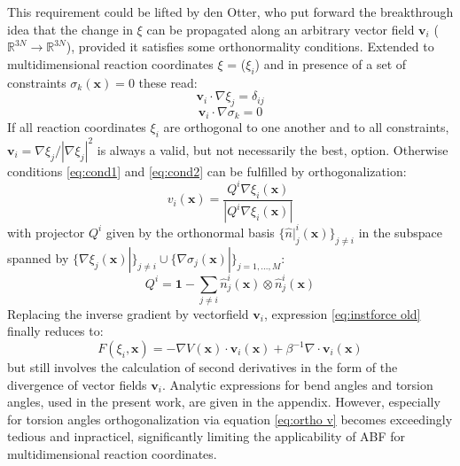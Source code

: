 This requirement could be lifted by den Otter\autocite{den2000thermodynamic}, who put forward the breakthrough idea that the change in $\xi$ can be propagated along an arbitrary vector field $\textbf{v}_i$ ($\mathbb{R}^{3N} \to \mathbb{R}^{3N}$), provided it satisfies some orthonormality conditions.
Extended to multidimensional reaction coordinates \textbf{$\xi$} = ($\xi_i$) and in presence of a set of constraints $\sigma_{k}(\textbf{x})=0$ these read:\autocite{ciccotti2005blue}
\begin{equation}
  \textbf{v}_i \cdot \nabla \xi_j = \delta_{ij} \label{eq:cond1}
\end{equation}
\begin{equation}
  \textbf{v}_i \cdot \nabla \sigma_k = 0 \label{eq:cond2}
\end{equation}
If all reaction coordinates $\xi_i$ are orthogonal to one another and to all constraints, $\textbf{v}_i = \nabla \xi_j/|\nabla \xi_j|^2$ is always a valid, but not necessarily the best, option.
Otherwise conditions \ref{eq:cond1} and \ref{eq:cond2} can be fulfilled by orthogonalization:\autocite{ciccotti2005blue}
\begin{equation}
  v_i (\textbf{x}) = \frac{Q^i \nabla \xi_i (\textbf{x})}{|Q^i \nabla \xi_i (\textbf{x})|} \label{eq:ortho v}
\end{equation}
with projector $Q^i$ given by the orthonormal basis $\{\hat{n}|_{j}^{i}(\textbf{x})\}_{j\neq i}$ in the subspace spanned by $\{\nabla \xi_j (\textbf{x})|\}_{j\neq i} \cup \{\nabla\sigma_j (\textbf{x})|\}_{j=1,...,M}$:
\begin{equation}
  Q^i = \textbf{1} - \sum_{j \neq i} \hat{n}_{j}^{i}(\textbf{x}) \otimes \hat{n}_{j}^{i}(\textbf{x})
\end{equation}
Replacing the inverse gradient by vectorfield $\textbf{v}_i$, expression \ref{eq:instforce old} finally reduces to:
\begin{equation}
  F(\xi_i,\textbf{x}) = -\nabla V(\textbf{x}) \cdot \textbf{v}_i(\textbf{x}) + \beta^{-1} \nabla \cdot \textbf{v}_i(\textbf{x})
\end{equation}
but still involves the calculation of second derivatives in the form of the divergence of vector fields $\textbf{v}_i$.\autocite{comer2015adaptive} Analytic expressions for bend angles and torsion angles, used in the present work, are given in the appendix. However, especially for torsion angles orthogonalization via equation \ref{eq:ortho v} becomes exceedingly tedious and inpracticel, significantly limiting the applicability of ABF for multidimensional reaction coordinates.


